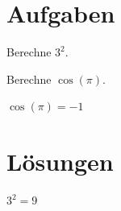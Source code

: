 \section{Aufgaben}
\begin{myexercise}[Hallo]\label{myexercise:01}
  Berechne $3^2$.
\end{myexercise}

\begin{myexercise}\label{myexercise:02}
  Berechne $\cos(\pi)$.
\end{myexercise}

\begin{myanswer}
  $\cos(\pi) = -1$
\end{myanswer}

\section{Lösungen}
\begin{myanswer}[myexercise:01]
 $3^2 = 9$
\end{myanswer}
